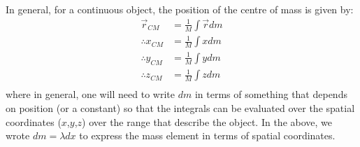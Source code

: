 In general, for a continuous object, the position of the centre of mass is given by:
\begin{align}
\vec r_{CM} &=\frac{1}{M}\int \vec r dm\nonumber\\
\therefore x_{CM} &= \frac{1}{M}\int x dm\nonumber\\
\therefore y_{CM} &=  \frac{1}{M}\int y dm\nonumber\\
\therefore z_{CM} &=  \frac{1}{M}\int z dm\\
\end{align}
where in general, one will need to write $dm$ in terms of something that depends on position (or a constant) so that the integrals can be evaluated over the spatial coordinates ($x$,$y$,$z$) over the range that describe the object. In the above, we wrote $dm = \lambda dx$ to express the mass element in terms of spatial coordinates.
